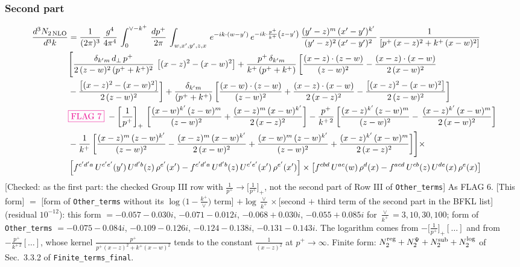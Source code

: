 \documentclass[9pt]{article}
\numberwithin{equation}{section}
\begin{document}
\subsubsection{Second part}
\begin{align}
 \frac{d^{3}N_{2\,\rm NLO}}{d^{3}k} & = \frac{1}{(2\pi)^{3}}\,\frac{g^{4}}{4\pi^{4}}\,\int_{0}^{\vee-k^{+}}\, \frac{dp^{+}}{2\pi}\,\int_{w,x',y',z,x}\, e^{-ik\cdot (w-y')}\,e^{-ik\cdot \frac{p^{+}}{k^{+}}\left(z-y'\right)}\, \frac{(y'-z)^{m}\,(x'-y')^{k'}\,}{(y'-z)^{2}\,(x'-y')^{2}\,}\, \frac{1}{\left[p^{+}\,(x-z)^{2}+k^{+}\,(x-w)^{2}\right]}\notag \\ & \Bigg[\frac{\delta_{k'm}\,d_{\perp}\,p^{+}}{2\,(z-w)^{2}\,(p^{+}+k^{+})^{2}}\, \left[(x-z)^{2}-(x-w)^{2}\right]+\frac{p^{+}\,\delta_{k'm}}{k^{+}\,(p^{+}+k^{+})}\,\bigg[\frac{(x-z)\cdot (z-w)}{(z-w)^{2}} -\frac{(x-z)\cdot (x-w)}{2\,(x-w)^{2}}\notag \\ & -\frac{\left[(x-z)^{2}-(x-w)^{2}\right]}{2\,(z-w)^{2}}\bigg] +\frac{\delta_{k'm}}{(p^{+}+k^{+})}\,\bigg[\frac{(x-w)\cdot (z-w)}{(z-w)^{2}}+\frac{(x-z)\cdot (x-w)}{2\,(x-z)^{2}} -\frac{\left[(x-z)^{2}-(x-w)^{2}\right]}{2\,(z-w)^{2}}\bigg]\notag \\ & {\color{magenta}\fbox{FLAG 7}}\;-\left[\frac{1}{p^{+}}\right]_{+}\,\bigg[\frac{(x-w)^{k'}\,(z-w)^{m}}{(z-w)^{2}}+\frac{(x-z)^{m}\,(x-w)^{k'}}{2\,(x-z)^{2}}\bigg]-\frac{p^{+}}{k^{+\,2}}\,\bigg[\frac{(x-z)^{k'}\,(z-w)^{m}}{(z-w)^{2}} -\,\frac{(x-z)^{k'}\,(x-w)^{m}}{2\,(x-w)^{2}}\bigg]\notag \\ & -\frac{1}{k^{+}}\,\bigg[\frac{(x-z)^{m}\,(z-w)^{k'}}{(z-w)^{2}}-\frac{(x-z)^{m}\,(x-w)^{k'}}{2\,(x-w)^{2}}+\frac{(x-w)^{m}\,(z-w)^{k'}}{(z-w)^{2}} +\frac{(x-z)^{k'}\,(x-w)^{m}}{2\,(x-z)^{2}}\bigg]\Bigg]\times\,\notag \\ & \left[f^{c'd'a}\,U^{c'e'}(y')\,U^{d'b}(z)\,\rho^{e'}(x')-f^{c'd'a}\, 
    U^{d'b}(z)\,U^{c'e'}(x')\,\rho^{e'}(x')\right]\times \left[f^{cbd}\,U^{ac}(w)\,\rho^{d}(x) -f^{acd}\,U^{cb}(z)\,U^{de}(x)\,\rho^{e}(x)\right]
\end{align} {\color{red}[Checked: as the first part: the checked Group III row with $\frac{1}{p^{+}}\to\big[\frac{1}{p^{+}}\big]_{+}$, not the second part of Row III of \texttt{Other\_terms}]} {\color{magenta} As FLAG 6. [This form] $=$ [form of \texttt{Other\_terms} without its $\log\big(1-\frac{k^{+}}{\vee}\big)$ term] $+\log\frac{\vee}{k^{+}}\times$[second $+$ third term of the second part in the BFKL list] (residual $10^{-12}$): this form $=-0.057-0.030i$, $-0.071-0.012i$, $-0.068+0.030i$, $-0.055+0.085i$ for $\frac{\vee}{k^{+}}=3,10,30,100$; form of \texttt{Other\_terms} $=-0.075-0.084i$, $-0.109-0.126i$, $-0.124-0.138i$, $-0.131-0.143i$. The logarithm comes from $-\big[\frac{1}{p^{+}}\big]_{+}[\dots]$ and from $-\frac{p^{+}}{k^{+\,2}}[\dots]$, whose kernel $\frac{p^{+}}{p^{+}(x-z)^{2}+k^{+}(x-w)^{2}}$ tends to the constant $\frac{1}{(x-z)^{2}}$ at $p^{+}\to\infty$. Finite form: $N_{2}^{\rm reg}+N_{2}^{\Psi}+N_{2}^{\rm sub}+N_{2}^{\log}$ of Sec.~3.3.2 of \texttt{Finite\_terms\_final}.}\par\noindent
\end{document}
